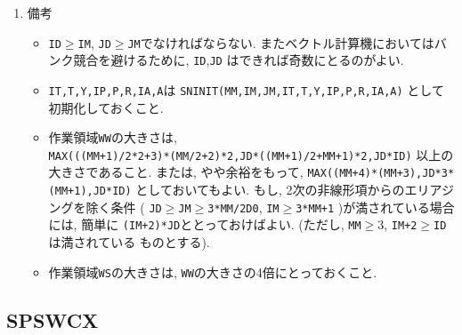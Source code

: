 \documentclass[a4j,fleqn]{jarticle}
\begin{document}
\begin{enumerate}
\item 備考

\begin{itemize}

\item {\tt ID}$\ge${\tt IM}, {\tt JD}$\ge${\tt JM}でなければならない.
   またベクトル計算機においてはバンク競合を避けるために, {\tt ID},{\tt JD}
   はできれば奇数にとるのがよい.

\item {\tt IT,T,Y,IP,P,R,IA,A}は 
      {\tt SNINIT(MM,IM,JM,IT,T,Y,IP,P,R,IA,A)} として初期化しておくこと.\\

\item 作業領域{\tt WW}の大きさは,\\
     {\tt MAX(((MM+1)/2*2+3)*(MM/2+2)*2,JD*((MM+1)/2+MM+1)*2,JD*ID)}
    以上の大きさであること. または, やや余裕をもって,
     {\tt MAX((MM+4)*(MM+3),JD*3*(MM+1),JD*ID)}
    としておいてもよい. もし, 2次の非線形項からのエリアジングを除く条件
     ( {\tt JD}$\ge${\tt JM}$\ge${\tt 3*MM/2D0}, 
      {\tt IM}$\ge${\tt 3*MM+1} )が満されている場合には, 簡単に
      {\tt (IM+2)*JD}ととっておけばよい.
     (ただし, {\tt MM}$\ge 3$, {\tt IM+2}$\ge${\tt ID}は満されている
    ものとする).
    
\item 作業領域{\tt WS}の大きさは, {\tt WW}の大きさの4倍にとっておくこと.    

 \end{itemize}

\end{enumerate}


\subsection{SPSWCX}
\end{document}
